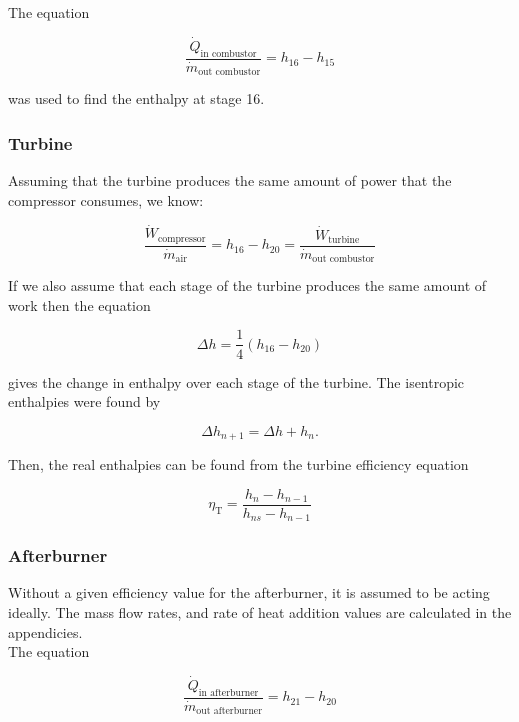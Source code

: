\documentclass[11pt]{article} %
\begin{document}
\noindent The equation 

\begin{equation*}
\frac{\dot{Q}_{\text{in combustor}}}{\dot{m}_{\text{out combustor}}} = h_{16} - h_{15}
\end{equation*}

\noindent was used to find the enthalpy at stage 16.

\subsubsection*{Turbine}
Assuming that the turbine produces the same amount of power that the compressor consumes, we know:

\begin{equation*}
\frac{\dot{W}_{\text{compressor}}}{\dot{m}_{\text{air}}} = h_{16} - h_{20} = \frac{\dot{W}_{\text{turbine}}}{\dot{m}_{\text{out combustor}}}
\end{equation*}

\noindent If we also assume that each stage of the turbine produces the same amount of work then the equation

\begin{equation*}
\Delta h = \frac{1}{4}(h_{16} - h_{20})
\end{equation*}

\noindent gives the change in enthalpy over each stage of the turbine. The isentropic enthalpies were found by

\begin{equation*}
\Delta h_{n+1} = \Delta h + h_n.
\end{equation*}

\noindent Then, the real enthalpies can be found from the turbine efficiency equation

\begin{equation*}
\eta_{\text{T}} = \frac{ h_{n} - h_{n-1} }{h_{ns} - h_{n-1}}
\end{equation*}

\subsubsection*{Afterburner}
Without a given efficiency value for the afterburner, it is assumed to be acting ideally. The mass flow rates, and rate of heat addition values are calculated in the appendicies. \\

\noindent The equation 

\begin{equation*}
\frac{\dot{Q}_{\text{in afterburner}}}{\dot{m}_{\text{out afterburner}}} = h_{21} - h_{20}
\end{equation*}
\end{document}
